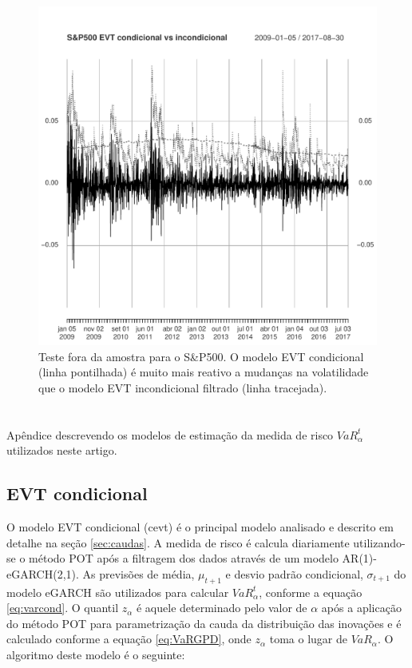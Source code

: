 \documentclass[1p]{elsarticle}
\theoremstyle{definition}
\begin{document}
\begin{figure}[H]
	\centering
	\includegraphics[width=1\linewidth]{figs/artigo-sp500evt}
	\caption{Teste fora da amostra para o S\&P500. O modelo EVT condicional (linha pontilhada) é muito mais reativo a mudanças na volatilidade que o modelo EVT incondicional filtrado (linha tracejada).}
	\label{fig:artigo-sp500evt}
\end{figure}

\appendix
\section{}
\label{apendice}

Apêndice descrevendo os modelos de estimação da medida de risco $VaR^t_\alpha$ utilizados neste artigo.

\subsection{EVT condicional}
\label{sec:appendix_cevt}

O modelo EVT condicional (cevt) é o principal modelo analisado e descrito em detalhe na seção \ref{sec:caudas}. A medida de risco é calcula diariamente utilizando-se o método POT após a filtragem dos dados através de um modelo AR(1)-eGARCH(2,1). As previsões de média, $\mu_{t+1}$ e desvio padrão condicional, $\sigma_{t+1}$ do modelo eGARCH são utilizados para calcular $VaR^t_\alpha$, conforme a equação \ref{eq:varcond}. O quantil $z_\alpha$ é aquele determinado pelo valor de $\alpha$ após a aplicação do método POT para parametrização da cauda da distribuição das inovações e é calculado conforme a equação \eqref{eq:VaRGPD}, onde $z_\alpha$ toma o lugar de $VaR_\alpha$. O algoritmo deste modelo é o seguinte:
\end{document}
